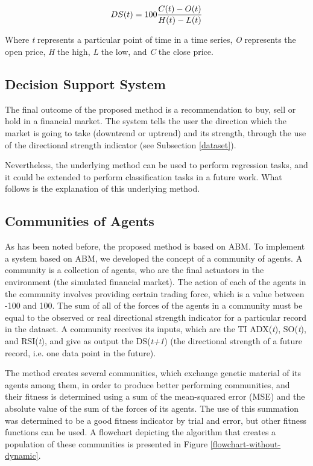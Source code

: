 \documentclass[12pt,journal,compsoc]{IEEEtran}
\begin{document}
\begin{equation} \label{directional-strength}
  DS(t) = 100{{C(t) - O(t)} \over {H(t) - L(t)}}
\end{equation}

Where \textit{t} represents a particular point of time in a time series, \textit{O} represents the open price, \textit{H} the high, \textit{L} the low, and \textit{C} the close price.

\subsection{Decision Support System}

The final outcome of the proposed method is a recommendation to buy, sell or hold in a financial market. The system tells the user the direction which the market is going to take (downtrend or uptrend) and its strength, through the use of the directional strength indicator (see Subsection \ref{dataset}).

Nevertheless, the underlying method can be used to perform regression tasks, and it could be extended to perform classification tasks in a future work. What follows is the explanation of this underlying method.

\subsection{Communities of Agents}
\label{communities-of-agents}

As has been noted before, the proposed method is based on ABM. To implement a system based on ABM, we developed the concept of a community of agents. A community is a collection of agents, who are the final actuators in the environment (the simulated financial market). The action of each of the agents in the community involves providing certain trading force, which is a value between -100 and 100. The sum of all of the forces of the agents in a community must be equal to the observed or real directional strength indicator for a particular record in the dataset. A community receives its inputs, which are the TI ADX(\textit{t}), SO(\textit{t}), and RSI(\textit{t}), and give as output the DS(\textit{t+1}) (the directional strength of a future record, i.e. one data point in the future).

The method creates several communities, which exchange genetic material of its agents among them, in order to produce better performing communities, and their fitness is determined using a sum of the mean-squared error (MSE) and the absolute value of the sum of the forces of its agents. The use of this summation was determined to be a good fitness indicator by trial and error, but other fitness functions can be used. A flowchart depicting the algorithm that creates a population of these communities is presented in Figure \ref{flowchart-without-dynamic}.
\end{document}
